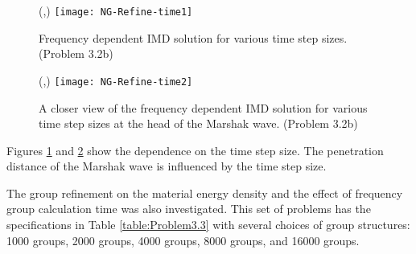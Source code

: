 \begin{figure}[htbp]
	\begin{center}
		\begin{minipage}[t]{6in}
		\centering
		\begin{picture}(\width,\height)
	                {\texttt{[image: NG-Refine-time1]}}
		\end{picture}
		\caption{\label{fig:NG-Refine-time1} Frequency dependent IMD solution for various time step sizes. (Problem 3.2b)}
		\end{minipage} %
	\end{center}
\end{figure}

\begin{figure}[htbp]
	\begin{center}
		\begin{minipage}[t]{6in}
		\centering
		\begin{picture}(\width,\height)
	                {\texttt{[image: NG-Refine-time2]}}
		\end{picture}
		\caption{\label{fig:NG-Refine-time2} A closer view of the frequency dependent IMD solution for various time step sizes at the head of the Marshak wave. (Problem 3.2b)}
		\end{minipage} %
	\end{center}
\end{figure}

	Figures \ref{fig:NG-Refine-time1} and \ref{fig:NG-Refine-time2} show the dependence on the time step size. The penetration distance of the Marshak wave is influenced by the time step size. 

	The group refinement on the material energy density and the effect of frequency group calculation time was also investigated. This set of problems has the specifications in Table \ref{table:Problem3.3} with several choices of group structures: 1000 groups, 2000 groups, 4000 groups, 8000 groups, and 16000 groups. 


